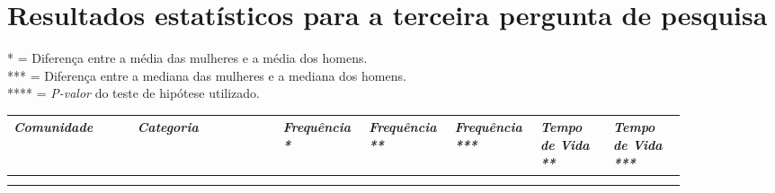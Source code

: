 \chapter{Resultados estatísticos para a terceira pergunta de pesquisa}
\label{app:q3}

\small

* = Diferença entre a média das mulheres e a média dos homens. \\
*** = Diferença entre a mediana das mulheres e a mediana dos homens. \\
**** = \textit{P-valor} do teste de hipótese utilizado. 
\begin{longtabu}{@{}
	p{0.17\linewidth}
	p{0.2\linewidth}
	P{0.1\linewidth}
	P{0.1\linewidth}
	P{0.1\linewidth}
	P{0.1\linewidth}
	p{0.1\linewidth}@{}}

\toprule
\textit{Comunidade}  & \textit{Categoria}  & \textit{Frequência *} & \textit{Frequência **} & \textit{Frequência ***} & \textit{Tempo de Vida **} & \textit{Tempo de Vida ***} \\ \midrule
\endhead

\\ \hline
\endfoot


\end{longtabu}
